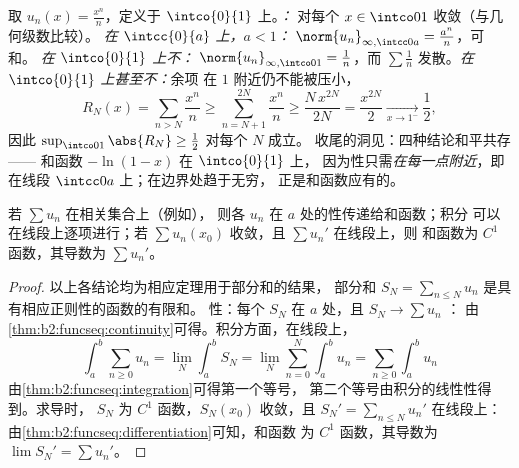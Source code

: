 \begin{example}[同一级数的三种结论]\label{ex:b2:funcseq:threemodes}
取 $u_n(x) = \frac{x^n}{n}$，定义于 $\intco{0}{1}$ 上。\emph{：}
对每个 $x \in \intco01$ 收敛（与几何级数比较）。
\emph{在 $\intcc{0}{a}$ 上，$a < 1$：}
$\norm{u_n}_{\infty,\intcc0a} = \frac{a^n}{n}$，可和。
\emph{在 $\intco{0}{1}$ 上不：}
$\norm{u_n}_{\infty,\intco01} = \frac1n$，而 $\sum\frac1n$
发散。\emph{在 $\intco{0}{1}$ 上甚至不：}余项
在 $1$ 附近仍不能被压小，
\[
R_N(x) = \sum_{n>N}\frac{x^n}{n}
\geq \sum_{n=N+1}^{2N}\frac{x^n}{n}
\geq \frac{N\,x^{2N}}{2N} = \frac{x^{2N}}{2}
\xrightarrow[x\to1^-]{} \frac12 ,
\]
因此 $\sup_{\intco01}\abs{R_N} \geq \frac12$ 对每个 $N$ 成立。
收尾的洞见：四种结论和平共存——
和函数 $-\ln(1-x)$ 在 $\intco{0}{1}$ 上，
因为性只需\emph{在每一点附近}，即
在线段 $\intcc0a$ 上；在边界处趋于无穷，
正是和函数应有的。
\end{example}

\begin{theorem}[级数的性质传递]\label{thm:b2:funcseq:seriestransfer}
若 $\sum u_n$ 在相关集合上（例如），
则各 $u_n$ 在 $a$ 处的性传递给和函数；积分
可以在线段上逐项进行；若 $\sum u_n(x_0)$
收敛，且 $\sum u_n'$ 在线段上，则
和函数为 $C^1$ 函数，其导数为 $\sum u_n'$。
\end{theorem}

\begin{proof}
以上各结论均为相应定理用于部分和的结果，
部分和 $S_N = \sum_{n\leq N}u_n$ 是具有相应正则性的函数的有限和。
性：每个 $S_N$
在 $a$ 处，且 $S_N \to \sum u_n$ ：
由\cref{thm:b2:funcseq:continuity}可得。积分方面，在线段上，
\[
\int_a^b \sum_{n\geq0} u_n
= \lim_N \int_a^b S_N
= \lim_N \sum_{n=0}^{N}\int_a^b u_n
= \sum_{n\geq0}\int_a^b u_n
\]
由\cref{thm:b2:funcseq:integration}可得第一个等号，
第二个等号由积分的线性性得到。求导时，
$S_N$ 为 $C^1$ 函数，$S_N(x_0)$ 收敛，且 $S_N' =
\sum_{n\leq N}u_n'$ 在线段上：
由\cref{thm:b2:funcseq:differentiation}可知，和函数
为 $C^1$ 函数，其导数为 $\lim S_N' = \sum u_n'$。
\end{proof}

